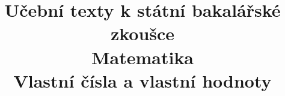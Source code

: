 \clearpage

\clearpage

\title{\LARGE Učební texty k státní bakalářské zkoušce \\ Matematika \\ Vlastní čísla a vlastní hodnoty}



\maketitle

\newpage
\setcounter{section}{13}



